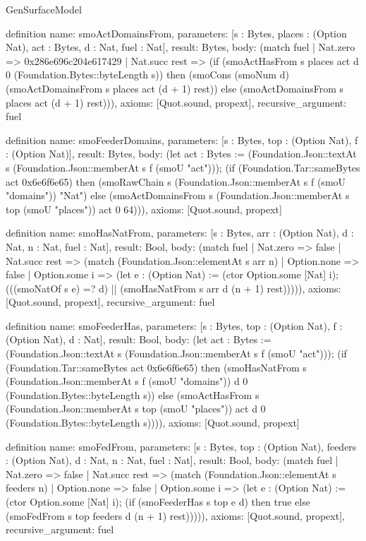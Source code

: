 \begin{lexlean}{GenSurfaceModel}
\begin{semanticmodule}
definition{
  name: smoActDomainsFrom,
  parameters: [s : Bytes, places : (Option Nat), act : Bytes, d : Nat, fuel : Nat],
  result: Bytes,
  body: (match fuel
    | Nat.zero => 0x286e696c204e617429
    | Nat.succ rest => (if (smoActHasFrom s places act d 0 (Foundation.Bytes::byteLength s)) then (smoCons (smoNum d) (smoActDomainsFrom s places act (d + 1) rest)) else (smoActDomainsFrom s places act (d + 1) rest))),
  axioms: [Quot.sound, propext],
  recursive_argument: fuel
}

definition{
  name: smoFeederDomains,
  parameters: [s : Bytes, top : (Option Nat), f : (Option Nat)],
  result: Bytes,
  body: (let act : Bytes := (Foundation.Json::textAt s (Foundation.Json::memberAt s f (smoU "act"))); (if (Foundation.Tar::sameBytes act 0x6e6f6e65) then (smoRawChain s (Foundation.Json::memberAt s f (smoU "domains")) "Nat") else (smoActDomainsFrom s (Foundation.Json::memberAt s top (smoU "places")) act 0 64))),
  axioms: [Quot.sound, propext]
}

definition{
  name: smoHasNatFrom,
  parameters: [s : Bytes, arr : (Option Nat), d : Nat, n : Nat, fuel : Nat],
  result: Bool,
  body: (match fuel
    | Nat.zero => false
    | Nat.succ rest => (match (Foundation.Json::elementAt s arr n)
      | Option.none => false
      | Option.some i => (let e : (Option Nat) := (ctor Option.some [Nat] i); (((smoNatOf s e) =? d) || (smoHasNatFrom s arr d (n + 1) rest))))),
  axioms: [Quot.sound, propext],
  recursive_argument: fuel
}

definition{
  name: smoFeederHas,
  parameters: [s : Bytes, top : (Option Nat), f : (Option Nat), d : Nat],
  result: Bool,
  body: (let act : Bytes := (Foundation.Json::textAt s (Foundation.Json::memberAt s f (smoU "act"))); (if (Foundation.Tar::sameBytes act 0x6e6f6e65) then (smoHasNatFrom s (Foundation.Json::memberAt s f (smoU "domains")) d 0 (Foundation.Bytes::byteLength s)) else (smoActHasFrom s (Foundation.Json::memberAt s top (smoU "places")) act d 0 (Foundation.Bytes::byteLength s)))),
  axioms: [Quot.sound, propext]
}

definition{
  name: smoFedFrom,
  parameters: [s : Bytes, top : (Option Nat), feeders : (Option Nat), d : Nat, n : Nat, fuel : Nat],
  result: Bool,
  body: (match fuel
    | Nat.zero => false
    | Nat.succ rest => (match (Foundation.Json::elementAt s feeders n)
      | Option.none => false
      | Option.some i => (let e : (Option Nat) := (ctor Option.some [Nat] i); (if (smoFeederHas s top e d) then true else (smoFedFrom s top feeders d (n + 1) rest))))),
  axioms: [Quot.sound, propext],
  recursive_argument: fuel
}


\end{semanticmodule}
\end{lexlean}
